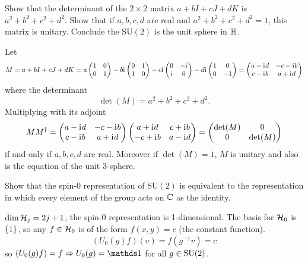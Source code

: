 \documentclass[10pt]{article}
\begin{document}
\begin{example}
	Show that the determinant of the $2\times2$ matrix $a+bI+cJ+dK$ is $a^2+b^2+c^2+d^2$. Show that if $a,b,c,d$ are real and $a^2+b^2+c^2+d^2=1$, this matrix is unitary. Conclude the SU$(2)$ is the unit sphere in $\mathbb{H}$.
\end{example}
\sol Let
$$
M = a+bI+cJ+dK = a\begin{pmatrix}
	1&0\\0&1
\end{pmatrix} -b\mathrm{i}\mkern1mu \begin{pmatrix}
	0&1\\1&0
\end{pmatrix} -c\mathrm{i}\mkern1mu \begin{pmatrix}
	0&-\mathrm{i}\mkern1mu\\\mathrm{i}\mkern1mu&0
\end{pmatrix} -d\mathrm{i}\mkern1mu \begin{pmatrix}
	1&0\\0&-1
\end{pmatrix} = \begin{pmatrix}
	a-\mathrm{i}\mkern1mu d&-c-\mathrm{i}\mkern1mu b\\c-\mathrm{i}\mkern1mu b&a+\mathrm{i}\mkern1mu d
\end{pmatrix}
$$
where the determinant
$$
\det (M) = a^2+b^2+c^2+d^2.
$$
Multiplying with its adjoint
$$
MM^\dag = \begin{pmatrix}
	a-\mathrm{i}\mkern1mu d&-c-\mathrm{i}\mkern1mu b\\c-\mathrm{i}\mkern1mu b&a+\mathrm{i}\mkern1mu d
\end{pmatrix} \begin{pmatrix}
	a+\mathrm{i}\mkern1mu d&c+\mathrm{i}\mkern1mu b\\-c+\mathrm{i}\mkern1mu b&a-\mathrm{i}\mkern1mu d
\end{pmatrix} = \begin{pmatrix}
	\det (M)&0\\0&\det (M)
\end{pmatrix}
$$
if and only if $a,b,c,d$ are real. Moreover if $\det (M) = 1$, $M$ is unitary and also is the equation of the unit 3-sphere.


\begin{example}
	Show that the spin-$0$ representation of SU$(2)$ is equivalent to the  representation in which every element of the group acts on $\mathbb{C}$ as the identity.
\end{example}
\sol $\dim\mathcal{H}_j = 2j+1$, the spin-$0$ representation is 1-dimensional. The basis for $\mathcal{H}_0$ is $\lbrace1\rbrace$, so any $f \in \mathcal{H}_0$ is of the form $f(x,y) = c$ (the constant function).
$$
(U_0(g)f)(v) = f(g^{-1}v) = c
$$
so $(U_0(g)f)=f \Rightarrow U_0(g) = \id$ for all $g \in \text{SU}(2)$.
\end{document}
